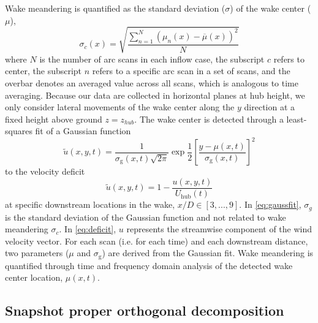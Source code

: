 \documentclass[%
 aip,
 amsmath,
 amssymb,
preprint,%
]{revtex4-2}
\begin{document}
Wake meandering is quantified as the standard deviation ($\sigma$) of the wake center ($\mu$), 
\begin{equation}
    \sigma_c(x) = \sqrt{\frac{\sum\limits_{n=1}^N\left(\mu_n(x) - \overline{\mu}(x)\right)^2}{N}}
    \label{eq:meander}
\end{equation}
where $N$ is the number of arc scans in each inflow case, the subscript $c$ refers to center, the subscript $n$ refers to a specific arc scan in a set of scans, and the overbar denotes an averaged value across all scans, which is analogous to time averaging. 
Because our data are collected in horizontal planes at hub height, we only consider lateral movements of the wake center along the $y$ direction at a fixed height above ground $z=z_{hub}$.
The wake center is detected through a least-squares fit of a Gaussian function
\begin{equation}
  \tilde{u}(x,y,t) = \frac{1}{\sigma_\text{g}(x,t) \sqrt{2 \pi}} \exp{\frac{1}{2}\left[ \frac{y-\mu(x,t)}{\sigma_\text{g}(x,t)}\right]^2}
  \label{eq:gaussfit}
\end{equation}
to the velocity deficit
\begin{equation}
    \tilde{u}(x,y,t) = 1 - \frac{u(x,y,t)}{U_\text{hub}(t)}
    \label{eq:deficit}
\end{equation}
at specific downstream locations in the wake,  $x/D\in[3,...,9]$. In \cref{eq:gaussfit}, $\sigma_g$ is the standard deviation of the Gaussian function and not related to wake meandering $\sigma_c$. In \cref{eq:deficit}, $u$ represents the streamwise component of the wind velocity vector. For each scan (i.e. for each time) and each downstream distance, two parameters ($\mu$ and $\sigma_\text{g}$) are derived from the Gaussian fit. 
Wake meandering is quantified through time and frequency domain analysis of the detected wake center location, $\mu(x,t)$.

\subsection{Snapshot proper orthogonal decomposition}
\label{sec:POD}
\end{document}
